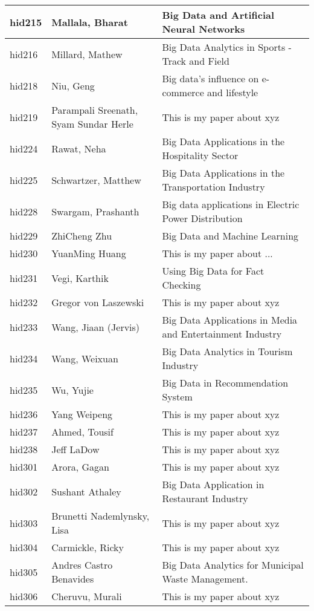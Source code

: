 \documentclass[12pt]{article}
\begin{document}
\begin{footnotesize}
\begin{longtable}{|p{1cm}p{5cm}p{9cm}|}
\hline
hid215 & Mallala, Bharat & Big Data and Artificial Neural Networks  \\
\hline
hid216 & Millard, Mathew & Big Data Analytics in Sports - Track and Field  \\
\hline
hid218 & Niu, Geng & Big data's influence on e-commerce and lifestyle  \\
\hline
hid219 & Parampali Sreenath, Syam Sundar Herle & This is my paper about xyz  \\
\hline
hid224 & Rawat, Neha & Big Data Applications in the Hospitality Sector  \\
\hline
hid225 & Schwartzer, Matthew & Big Data Applications in the Transportation Industry  \\
\hline
hid228 & Swargam, Prashanth & Big data applications in Electric Power Distribution  \\
\hline
hid229 & ZhiCheng Zhu & Big Data and Machine Learning  \\
\hline
hid230 & YuanMing Huang & This is my paper about ...  \\
\hline
hid231 & Vegi, Karthik & Using Big Data for Fact Checking  \\
\hline
hid232 & Gregor von Laszewski & This is my paper about xyz  \\
\hline
hid233 & Wang, Jiaan (Jervis) & Big Data Applications in Media and Entertainment Industry  \\
\hline
hid234 & Wang, Weixuan & Big Data Analytics in Tourism Industry  \\
\hline
hid235 & Wu, Yujie & Big Data in Recommendation System  \\
\hline
hid236 & Yang Weipeng & This is my paper about xyz  \\
\hline
hid237 & Ahmed, Tousif & This is my paper about xyz  \\
\hline
hid238 & Jeff LaDow & This is my paper about xyz  \\
\hline
hid301 & Arora, Gagan & This is my paper about xyz  \\
\hline
hid302 & Sushant Athaley & Big Data Application in Restaurant Industry  \\
\hline
hid303 & Brunetti Nademlynsky, Lisa & This is my paper about xyz  \\
\hline
hid304 & Carmickle, Ricky & This is my paper about xyz  \\
\hline
hid305 & Andres Castro Benavides & Big Data Analytics for Municipal Waste Management.  \\
\hline
hid306 & Cheruvu, Murali & This is my paper about xyz  \\

\end{longtable}
\end{footnotesize}
\end{document}
